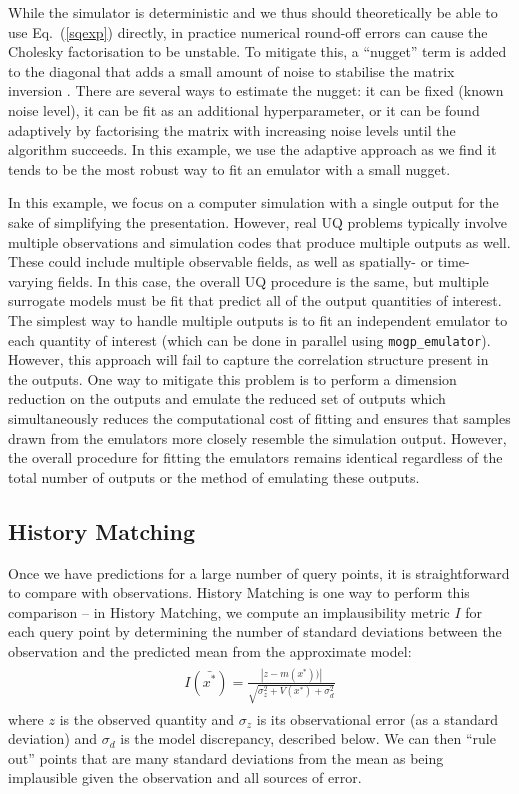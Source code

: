 \documentclass[openacc]{rstransa}%
\begin{document}
While the simulator is deterministic and we thus should theoretically be able to use Eq.~(\ref{sqexp})
directly, in practice numerical round-off errors can cause the Cholesky factorisation to be
unstable. To mitigate this, a ``nugget'' term is added to the diagonal that adds a small amount
of noise to stabilise the matrix inversion \cite{nugget}. There are several ways to estimate the nugget: it can
be fixed (known noise level), it can be fit as an additional hyperparameter, or it can be found
adaptively by factorising the matrix with increasing noise levels until the algorithm succeeds.
In this example, we use the adaptive approach as we find it tends to be the most robust way to fit an
emulator with a small nugget.

In this example, we focus on a computer simulation with a single output for
the sake of simplifying the presentation. However, real UQ problems typically
involve multiple observations and simulation codes that produce multiple
outputs as well. These could include multiple observable fields, as well as
spatially- or time-varying fields. In this case, the overall UQ procedure
is the same, but multiple surrogate models must be fit that predict all of
the output quantities of interest. The simplest way to handle multiple
outputs is to fit an independent emulator to each quantity of interest
(which can be done in parallel using \texttt{mogp\_emulator}). However,
this approach will fail to capture the correlation structure present in
the outputs. One way to mitigate this problem is to perform a dimension
reduction on the outputs and emulate the reduced set of outputs
\cite{dimreduction} which simultaneously reduces the computational cost
of fitting and ensures that samples drawn from the emulators more closely
resemble the simulation output. However, the overall procedure for fitting
the emulators remains identical regardless of the total number of outputs
or the method of emulating these outputs.

\subsection{History Matching}

Once we have predictions for a large number of query points, it is straightforward to compare with observations.
History Matching is one way to perform this comparison \cite{histmatch} -- in History Matching, we compute an implausibility
metric $I$ for each query point by determining the number of standard deviations between the observation and the
predicted mean from the approximate model:
\begin{align}\label{implaus}
\begin{split}
I(\bar{x^*}) = \frac{|z - m(x^*))|}{\sqrt{\sigma_z^2+V(x^*)+\sigma_d^2}}
\end{split}
\end{align}
where $z$ is the observed quantity and $\sigma_z$ is its observational error (as a standard deviation) and
$\sigma_d$ is the model discrepancy, described below. We can then ``rule out'' points that are many standard deviations from the mean as being implausible given the observation and all sources of error.
\end{document}
